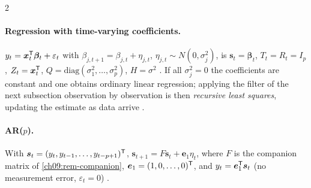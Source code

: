 \begin{paracol}{2}
\paragraph{Regression with time-varying coefficients.} $y_t=\bm x_t^{\mathsf T}\bm\beta_t+\varepsilon_t$ with $\beta_{j,t+1}=\beta_{j,t}+\eta_{j,t}$, $\eta_{j,t}\sim N(0,\sigma_j^2)$, is
$\bm s_t=\bm\beta_t$, $T_t=R_t=I_p$, $Z_t=\bm x_t^{\mathsf T}$, $Q=\mathrm{diag}(\sigma_1^2,\dots,\sigma_p^2)$, $H=\sigma^2$ . If all $\sigma_j^2=0$ the coefficients are constant
and one obtains ordinary linear regression; applying the filter of the next subsection observation by observation is then \emph{recursive least squares}, updating the estimate as
data arrive .

\paragraph{AR($p$).} With $\bm s_t=(y_t,y_{t-1},\dots,y_{t-p+1})^{\mathsf T}$,
$\bm s_{t+1}=F\bm s_t+\bm e_1\eta_t$, where $F$ is the companion matrix of \cref{ch09:rem-companion}, $\bm e_1=(1,0,\dots,0)^{\mathsf T}$, and $y_t=\bm e_1^{\mathsf T}\bm s_t$ (no measurement
error, $\varepsilon_t=0$) .


\end{paracol}
